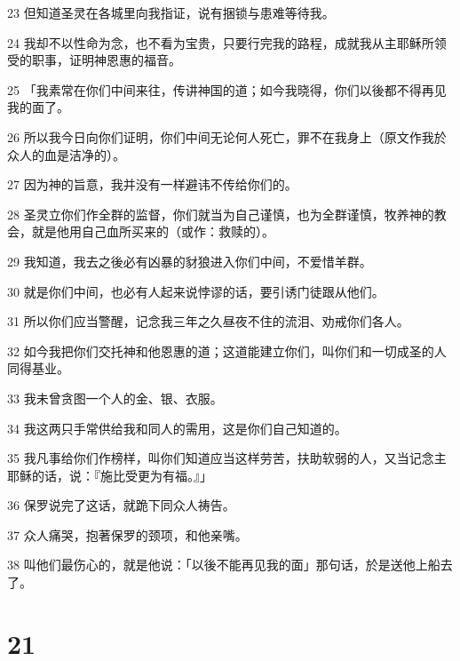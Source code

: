 \par 23 但知道圣灵在各城里向我指证，说有捆锁与患难等待我。
\par 24 我却不以性命为念，也不看为宝贵，只要行完我的路程，成就我从主耶稣所领受的职事，证明神恩惠的福音。
\par 25 「我素常在你们中间来往，传讲神国的道；如今我晓得，你们以後都不得再见我的面了。
\par 26 所以我今日向你们证明，你们中间无论何人死亡，罪不在我身上（原文作我於众人的血是洁净的）。
\par 27 因为神的旨意，我并没有一样避讳不传给你们的。
\par 28 圣灵立你们作全群的监督，你们就当为自己谨慎，也为全群谨慎，牧养神的教会，就是他用自己血所买来的（或作：救赎的）。
\par 29 我知道，我去之後必有凶暴的豺狼进入你们中间，不爱惜羊群。
\par 30 就是你们中间，也必有人起来说悖谬的话，要引诱门徒跟从他们。
\par 31 所以你们应当警醒，记念我三年之久昼夜不住的流泪、劝戒你们各人。
\par 32 如今我把你们交托神和他恩惠的道；这道能建立你们，叫你们和一切成圣的人同得基业。
\par 33 我未曾贪图一个人的金、银、衣服。
\par 34 我这两只手常供给我和同人的需用，这是你们自己知道的。
\par 35 我凡事给你们作榜样，叫你们知道应当这样劳苦，扶助软弱的人，又当记念主耶稣的话，说：『施比受更为有福。』」
\par 36 保罗说完了这话，就跪下同众人祷告。
\par 37 众人痛哭，抱著保罗的颈项，和他亲嘴。
\par 38 叫他们最伤心的，就是他说：「以後不能再见我的面」那句话，於是送他上船去了。

\chapter{21}

